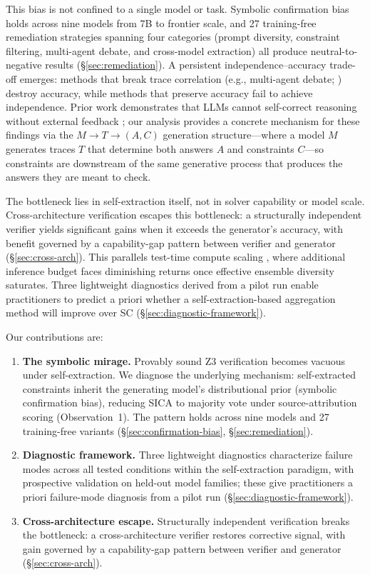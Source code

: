 This bias is not confined to a single model or task. Symbolic confirmation bias holds across nine models from 7B to frontier scale, and 27 training-free remediation strategies spanning four categories (prompt diversity, constraint filtering, multi-agent debate, and cross-model extraction) all produce neutral-to-negative results (\S\ref{sec:remediation}). A persistent independence--accuracy trade-off emerges: methods that break trace correlation (e.g., multi-agent debate; \citealp{liang2023encouraging, du2023improving}) destroy accuracy, while methods that preserve accuracy fail to achieve independence. Prior work demonstrates that LLMs cannot self-correct reasoning without external feedback \citep{huang2024selfcorrect, kamoi2024selfcorrect}; our analysis provides a concrete mechanism for these findings via the $M{\to}T{\to}(A,C)$ generation structure---where a model $M$ generates traces $T$ that determine both answers $A$ and constraints $C$---so constraints are downstream of the same generative process that produces the answers they are meant to check.

The bottleneck lies in self-extraction itself, not in solver capability or model scale. Cross-architecture verification escapes this bottleneck: a structurally independent verifier yields significant gains when it exceeds the generator's accuracy, with benefit governed by a capability-gap pattern between verifier and generator (\S\ref{sec:cross-arch}). This parallels test-time compute scaling \citep{snell2025scaling}, where additional inference budget faces diminishing returns once effective ensemble diversity saturates. Three lightweight diagnostics derived from a pilot run enable practitioners to predict a priori whether a self-extraction-based aggregation method will improve over SC (\S\ref{sec:diagnostic-framework}).

Our contributions are:
\begin{enumerate}[nosep,leftmargin=*]
\item \textbf{The symbolic mirage.} Provably sound Z3 verification becomes vacuous under self-extraction. We diagnose the underlying mechanism: self-extracted constraints inherit the generating model's distributional prior (symbolic confirmation bias), reducing SICA to majority vote under source-attribution scoring (Observation~1). The pattern holds across nine models and 27 training-free variants (\S\ref{sec:confirmation-bias}, \S\ref{sec:remediation}).

\item \textbf{Diagnostic framework.} Three lightweight diagnostics characterize failure modes across all tested conditions within the self-extraction paradigm, with prospective validation on held-out model families; these give practitioners a priori failure-mode diagnosis from a pilot run (\S\ref{sec:diagnostic-framework}).

\item \textbf{Cross-architecture escape.} Structurally independent verification breaks the bottleneck: a cross-architecture verifier restores corrective signal, with gain governed by a capability-gap pattern between verifier and generator (\S\ref{sec:cross-arch}).
\end{enumerate}

